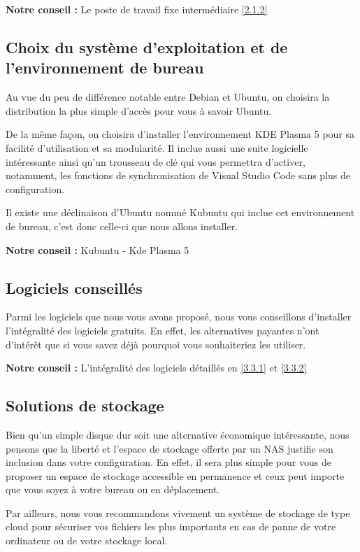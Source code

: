 \textbf{Notre conseil :}  Le poste de travail fixe intermédiaire \ref{2.1.2}

\subsection{Choix du système d'exploitation et de l'environnement de bureau}

Au vue du peu de différence notable entre Debian et Ubuntu, on choisira la distribution la plus simple d'accès pour vous à savoir Ubuntu.

De la même façon, on choisira d'installer l'environnement KDE Plasma 5 pour sa facilité d'utilisation et sa modularité. Il inclue aussi une suite logicielle intéressante ainsi qu'un trousseau de clé qui vous permettra d'activer, notamment, les fonctions de synchronisation de Visual Studio Code sans plus de configuration.

Il existe une déclinaison d'Ubuntu nommé Kubuntu qui inclue cet environnement de bureau, c'est donc celle-ci que nous allons installer.

\textbf{Notre conseil :} Kubuntu - Kde Plasma 5

\subsection{Logiciels conseillés}

Parmi les logiciels que nous vous avons proposé, nous vous conseillons d'installer l'intégralité des logiciels gratuits. En effet, les alternatives payantes n'ont d'intérêt que si vous savez déjà pourquoi vous souhaiteriez les utiliser.

\textbf{Notre conseil :} L'intégralité des logiciels détaillés en \ref{3.3.1} et \ref{3.3.2}

\subsection{Solutions de stockage}

Bien qu'un simple disque dur soit une alternative économique intéressante, nous pensons que la liberté et l'espace de stockage offerte par un NAS justifie son inclusion dans votre configuration. En effet, il sera plus simple pour vous de proposer un espace de stockage accessible en permanence et ceux peut importe que vous soyez à votre bureau ou en déplacement.

Par ailleurs, nous vous recommandons vivement un système de stockage de type cloud pour sécuriser vos fichiers les plus importants en cas de panne de votre ordinateur ou de votre stockage local.

